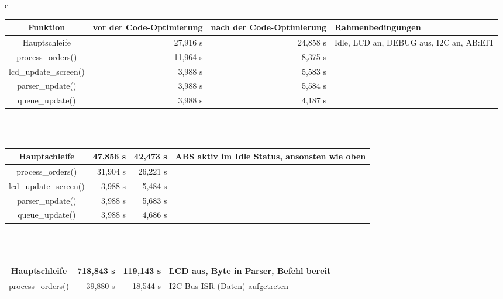 \begin{table}[htb]
\begin{center}
	\begin{tabular}{c}
	\begin{tabularx}{\textwidth}{|c||R|R|X|}
		\hline
		\textbf{Funktion}     & \textbf{vor der Code-Optimierung} & \textbf{nach der Code-Optimierung} & \textbf{Rahmen\-bedingungen} \\ 
		\hline \hline
		Hauptschleife         & 27,916 \textmu{}s      & 24,858 \textmu{}s       & Idle, LCD an, DEBUG aus, I2C an, AB:EIT \\ \hline
		process\_orders()     & 11,964 \textmu{}s      &  8,375 \textmu{}s       & \\ \hline
		lcd\_update\_screen() &  3,988 \textmu{}s      &  5,583 \textmu{}s       & \\ \hline
		parser\_update()      &  3,988 \textmu{}s      &  5,584 \textmu{}s       & \\ \hline
		queue\_update()       &  3,988 \textmu{}s      &  4,187 \textmu{}s       & \\ \hline
	\end{tabularx} \\
	\\
	\begin{tabularx}{\textwidth}{|c||R|R|X|}
		\hline
		Hauptschleife         & 47,856 \textmu{}s      & 42,473 \textmu{}s       & ABS aktiv im Idle Status, ansonsten wie oben \\ \hline
		process\_orders()     & 31,904 \textmu{}s      & 26,221 \textmu{}s       & \\ \hline
		lcd\_update\_screen() &  3,988 \textmu{}s      &  5,484 \textmu{}s       & \\ \hline
		parser\_update()      &  3,988 \textmu{}s      &  5,683 \textmu{}s       & \\ \hline
		queue\_update()       &  3,988 \textmu{}s      &  4,686 \textmu{}s       & \\ \hline
	\end{tabularx} \\
	\\
	\begin{tabularx}{\textwidth}{|c||R|R|X|}
		\hline
		Hauptschleife         & 718,843 \textmu{}s     & 119,143 \textmu{}s      & LCD aus, Byte in Parser, Befehl bereit \\ \hline
		process\_orders()     &  39,880 \textmu{}s     &  18,544 \textmu{}s      & I2C-Bus ISR (Daten) aufgetreten \\ \hline

\end{tabularx}
\end{tabular}
\end{center}
\end{table}
